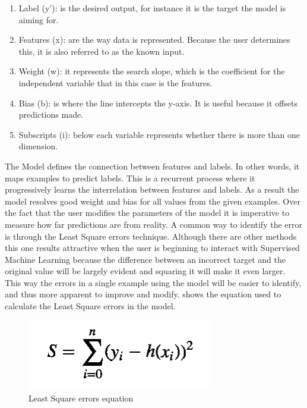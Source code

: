 \begin{enumerate}
 \item Label (y’): is the desired output, for instance it is the target the model is aiming for.
 \item Features (x):  are the way data is represented. Because the user determines this, it is also referred to as the known input.  
 \item Weight (w):  it represents the search slope, which is the coefficient for the independent variable that in this case is the features.  
 \item Bias (b): is where the line intercepts the y-axis. It is useful because it offsets predictions made. 
 \item Subscripts (i): below each variable represents whether there is more than one dimension.
\end{enumerate}


The Model defines the connection between features and labels. In other words, it maps examples to predict labels. This is a recurrent process where it progressively learns the interrelation between features and labels. As a result the model resolves good weight and bias for all values from the given examples.  Over the fact that the user modifies the parameters of the model it is imperative to measure how far predictions are from reality.  A common way to identify the error is through the Least Square errors technique. Although there are other methods this one results attractive when the user is beginning to interact with Supervised Machine Learning because the difference between an incorrect target and the original value will be largely evident and squaring it will make it even larger. This way the errors in a single example using the model will be easier to identify, and thus more apparent to improve and modify. shows the equation used to calculate the Least Square errors in the model.


\begin{figure}[htbp]
  \centering
  \includegraphics[width=\textwidth]{images/equation1}
  \caption{ Least Square errors equation}
  \label{fig:L2loss equation}
\end{figure}


